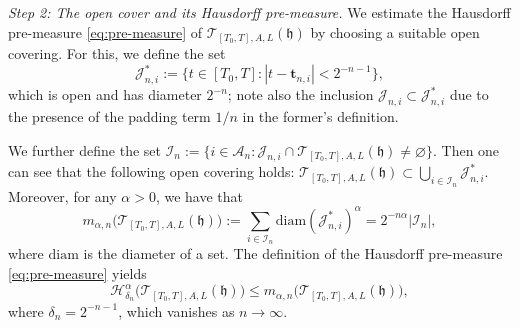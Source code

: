 \documentclass[oneside,final,11pt]{amsart}
\theoremstyle{definition}
\newcommand{\fh}{\mathfrak{h}}
\newcommand{\diam}{\mathrm{diam}}
\newcommand{\CT}{\mathcal{T}}
\newcommand{\CH}{\mathcal{H}}
\newcommand{\1}[1]{\mathbf{1}_{#1}}
\newcommand{\ft}{\mathbf{t}}
\newcommand{\CI}{\mathcal{I}}
\newcommand{\CJ}{\mathcal{J}}
\newcommand{\CA}{\mathcal{A}}
\let\emptyset\varnothing
\numberwithin{equation}{section}
\begin{document}
\emph{Step 2: The open cover and its Hausdorff pre-measure.} We estimate the Hausdorff pre-measure \eqref{eq:pre-measure} of $\CT_{[T_0, T], A, L}(\fh)$ by choosing a suitable open covering. For this, we define the set
\begin{equation}
\CJ^*_{n, i} := \bigl\{t \in [T_0,T] : |t - \ft_{n, i}| < 2^{-n - 1}\bigr\},
\end{equation}
which is open and has diameter $2^{-n}$; note also the inclusion $\CJ_{n, i} \subset \CJ^*_{n, i}$ due to the presence of the padding term $1/n$ in the former's definition.

We further define the set $\CI_n := \{i \in \CA_n : \CJ_{n, i} \cap \CT_{[T_0, T], A, L}(\fh) \neq \emptyset\}$.
Then one can see that the following open covering holds: $\CT_{[T_0, T], A, L}(\fh)\subset \bigcup_{i \in \CI_n} \CJ^*_{n, i}$. Moreover, for any $\alpha > 0$, we have that
%
\begin{equation}\label{eq:m-bound}
m_{\alpha, n} \bigl(\CT_{[T_0, T], A, L}(\fh) \bigr) := \sum_{i \in \CI_n} \diam(\CJ^*_{n, i})^\alpha = 2^{-n\alpha} |\CI_n|,
\end{equation}
%
where $\diam$ is the diameter of a set. The definition of the Hausdorff pre-measure \eqref{eq:pre-measure} yields
\begin{equation}\label{eq:UpperBound2}
\CH^\alpha_{\delta_n}\bigl(\CT_{[T_0, T], A, L}(\fh) \bigr) \leq m_{\alpha, n} \bigl(\CT_{[T_0, T], A, L}(\fh) \bigr),
\end{equation}
where $\delta_n = 2^{-n - 1}$, which vanishes as $n \to \infty$.
\end{document}

